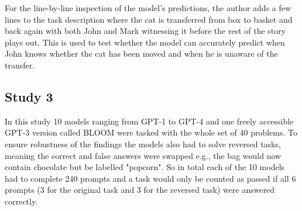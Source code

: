 For the line-by-line inspection of the model's predictions, the author adds a few lines to the task description where the cat is transferred from box to basket and back again with both John and Mark witnessing it before the rest of the story plays out. This is used to test whether the model can accurately predict when John knows whether the cat has been moved and when he is unaware of the transfer.

\subsection{Study 3}
In this study 10 models ranging from GPT-1 to GPT-4 and one freely accessible GPT-3 version called BLOOM were tasked with the whole set of 40 problems. To ensure robustness of the findings the models also had to solve reversed tasks, meaning the correct and false answers were swapped e.g., the bag would now contain chocolate but be labelled "popcorn". So in total each of the 10 models had to complete 240 prompts and a task would only be counted as passed if all 6 prompts (3 for the original task and 3 for the reversed task) were answered correctly.
